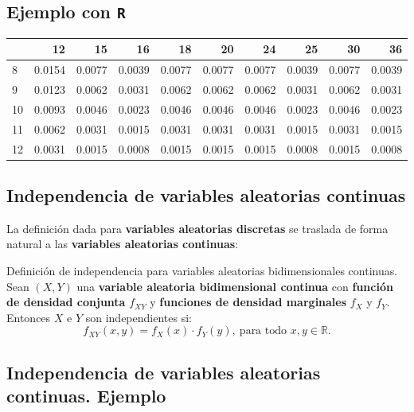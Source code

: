 \documentclass[]{book}
\begin{document}
\hypertarget{ejemplo-con-r-4}{%
\subsection{\texorpdfstring{Ejemplo con \texttt{R}}{Ejemplo con R}}\label{ejemplo-con-r-4}}

\begin{tabular}{l|r|r|r|r|r|r|r|r|r}
\hline
  & 12 & 15 & 16 & 18 & 20 & 24 & 25 & 30 & 36\\
\hline
8 & 0.0154 & 0.0077 & 0.0039 & 0.0077 & 0.0077 & 0.0077 & 0.0039 & 0.0077 & 0.0039\\
\hline
9 & 0.0123 & 0.0062 & 0.0031 & 0.0062 & 0.0062 & 0.0062 & 0.0031 & 0.0062 & 0.0031\\
\hline
10 & 0.0093 & 0.0046 & 0.0023 & 0.0046 & 0.0046 & 0.0046 & 0.0023 & 0.0046 & 0.0023\\
\hline
11 & 0.0062 & 0.0031 & 0.0015 & 0.0031 & 0.0031 & 0.0031 & 0.0015 & 0.0031 & 0.0015\\
\hline
12 & 0.0031 & 0.0015 & 0.0008 & 0.0015 & 0.0015 & 0.0015 & 0.0008 & 0.0015 & 0.0008\\
\hline
\end{tabular}

\hypertarget{independencia-de-variables-aleatorias-continuas}{%
\subsection{Independencia de variables aleatorias continuas}\label{independencia-de-variables-aleatorias-continuas}}

La definición dada para \textbf{variables aleatorias discretas} se traslada de forma natural a las \textbf{variables aleatorias continuas}:

Definición de independencia para variables aleatorias bidimensionales continuas.
Sean \((X,Y)\) una \textbf{variable aleatoria bidimensional continua} con \textbf{función de densidad conjunta} \(f_{XY}\) y \textbf{funciones de densidad marginales} \(f_X\) y \(f_Y\). Entonces \(X\) e \(Y\) son independientes si:
\[
f_{XY}(x,y)=f_X(x)\cdot f_Y(y),\ \mbox{para todo $x,y\in\mathbb{R}$.}
\]

\hypertarget{independencia-de-variables-aleatorias-continuas.-ejemplo}{%
\subsection{Independencia de variables aleatorias continuas. Ejemplo}\label{independencia-de-variables-aleatorias-continuas.-ejemplo}}
\end{document}
